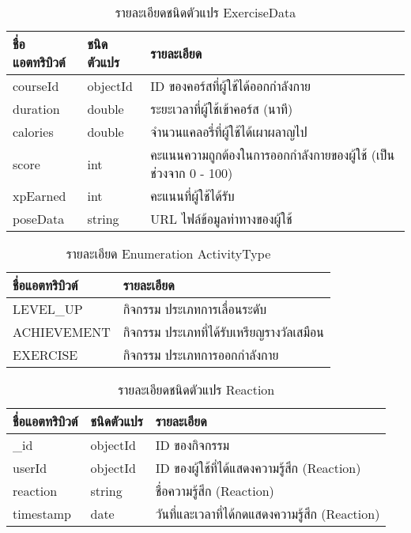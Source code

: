 \begin{table}
    \caption{รายละเอียดชนิดตัวแปร ExerciseData}
    \begin{tabularx}{\textwidth}{ | l | l | X | }
        \hline
        \bf ชื่อแอตทริบิวต์ & \bf ชนิดตัวแปร & \bf รายละเอียด \\\hline
        courseId & objectId & ID ของคอร์สที่ผู้ใช้ได้ออกกำลังกาย\\\hline
        duration & double & ระยะเวลาที่ผู้ใช้เข้าคอร์ส (นาที)\\\hline
        calories & double & จำนวนแคลอรี่ที่ผู้ใช้ได้เผาผลาญไป\\\hline
        score & int & คะแนนความถูกต้องในการออกกำลังกายของผู้ใช้ (เป็นช่วงจาก 0 - 100)\\\hline
        xpEarned & int & คะแนนที่ผู้ใช้ได้รับ\\\hline
        poseData & string & URL ไฟล์ข้อมูลท่าทางของผู้ใช้\\\hline
    \end{tabularx}
\end{table}

\begin{table}
    \caption{รายละเอียด Enumeration ActivityType}
    \begin{tabularx}{\textwidth}{ | l | X | }
        \hline
        \bf ชื่อแอตทริบิวต์ & \bf รายละเอียด \\\hline
        LEVEL\_UP & กิจกรรม ประเภทการเลื่อนระดับ\\\hline
        ACHIEVEMENT & กิจกรรม ประเภทที่ได้รับเหรียญรางวัลเสมือน\\\hline
        EXERCISE & กิจกรรม ประเภทการออกกำลังกาย\\\hline
    \end{tabularx}
\end{table}

\begin{table}
    \caption{รายละเอียดชนิดตัวแปร Reaction}
    \begin{tabularx}{\textwidth}{ | l | l | X | }
        \hline
        \bf ชื่อแอตทริบิวต์ & \bf ชนิดตัวแปร & \bf รายละเอียด \\\hline
        \_id & objectId & ID ของกิจกรรม\\\hline
        userId & objectId & ID ของผู้ใช้ที่ได้แสดงความรู้สึก (Reaction)\\\hline
        reaction & string & ชื่อความรู้สึก (Reaction)\\\hline
        timestamp & date & วันที่และเวลาที่ได้กดแสดงความรู้สึก (Reaction)\\\hline
    \end{tabularx}
\end{table}

